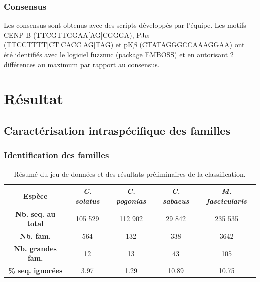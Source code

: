 \documentclass[12pt,a4paper]{article}
\begin{document}
		\subsubsection{Consensus}
Les consensus sont obtenus avec des scripts développés par l'équipe. Les motifs CENP-B (TTCGTTGGAA[AG]CGGGA), PJ$\alpha$ (TTCCTTTT[CT]CACC[AG]TAG) et pK$\beta$ (CTATAGGGCCAAAGGAA) ont été identifiés avec le logiciel fuzznuc (package EMBOSS) \cite{Rice2000} et en autorisant 2 différences au maximum par rapport au consensus.

\section{Résultat}
	\subsection{Caractérisation intraspécifique des familles}
			\subsubsection{Identification des familles}
		
		\begin{table}
			\center
			\begin{tabular}{|c|c|c|c|c|}
   			\hline
  			\textbf{Espèce} & \textit{C. solatus} & \textit{C. pogonias} & \textit{C. sabaeus} & \textit{M. fascicularis}\\
		    \hline
   			\textbf{Nb. seq. au total} & 105 529 & 112 902 & 29 842 & 235 535 \\
   			\hline
   			\textbf{Nb. fam.} & 564 & 132 & 338 & 3642\\
   			\hline
   			\textbf{Nb. grandes fam.} & 12 & 13 & 43 & 105\\
   			\hline
   			\textbf{\% seq. ignorées} & 3.97 & 1.29 & 10.89 & 10.75\\
   			\hline
			\end{tabular}
			\caption{Résumé du jeu de données et des résultats préliminaires de la classification.}
			\label{tab_res}
		\end{table}
		
\end{document}

